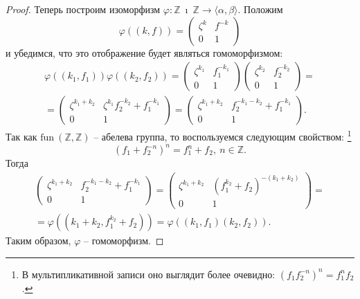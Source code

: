 \documentclass{article}
\begin{document}
\begin{proof}
    Теперь построим изоморфизм $\varphi: \mathbb{Z} \ \imath \ \mathbb{Z} \rightarrow \langle \alpha, \beta \rangle$. Положим
     \[
        \varphi((k, f)) =
        \begin{pmatrix}
            \zeta^k & f^{-k} \\
            0 & 1
        \end{pmatrix}
     \]
     и убедимся, что это отображение будет являться гомоморфизмом:
     \begin{multline*}
        \varphi((k_1, f_1)) \varphi((k_2, f_2)) =
        \begin{pmatrix}
            \zeta^{k_1} & f_1^{-k_1} \\
            0 & 1
        \end{pmatrix}
        \begin{pmatrix}
            \zeta^{k_2} & f_2^{-k_2} \\
            0 & 1
        \end{pmatrix} =  \\
        =
        \begin{pmatrix}
            \zeta^{k_1 + k_2} & \zeta^{k_1} f_2^{-k_2} + f_1^{-k_1} \\
            0 & 1
        \end{pmatrix}
        =
        \begin{pmatrix}
            \zeta^{k_1 + k_2} & f_2^{-k_1 - k_2} + f_1^{-k_1} \\
            0 & 1
        \end{pmatrix}
        .
     \end{multline*}
     Так как $\mathrm{fun} \ (\mathbb{Z}, \mathbb{Z})$ -- абелева группа, то воспользуемся следующим свойством: \footnote{В мультипликативной записи оно выглядит более очевидно: $(f_1 f_2^{-n})^n = f_1^n f_2$.}
     \[
        (f_1 + f_2^{-n})^{n} = f_1^n + f_2, \ n \in \mathbb{Z}.
     \]
     Тогда
     \begin{multline*}
        \begin{pmatrix}
            \zeta^{k_1 + k_2} & f_2^{-k_1 - k_2} + f_1^{-k_1} \\
            0 & 1
        \end{pmatrix} = 
        \begin{pmatrix}
            \zeta^{k_1 + k_2} & (f_1^{k_2} + f_2)^{-(k_1 + k_2)} \\
            0 & 1
        \end{pmatrix} = \\
        = \varphi((k_1 + k_2, f_1^{k_2} + f_2)) = \varphi((k_1, f_1)(k_2, f_2)).
     \end{multline*}
     Таким образом, $\varphi$ -- гомоморфизм.


\end{proof}
\end{document}
